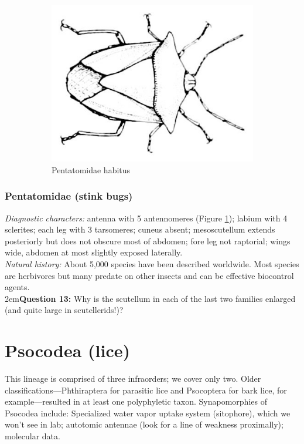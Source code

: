 \documentclass[letterpaper, 11pt]{article}
\begin{document}
\begin{figure}[ht!]
\begin{subfigure}[ht!]{0.4\textwidth}
 \includegraphics[width=\textwidth]{PentatomidHabitus}
 \caption{Pentatomidae habitus \citep[][Plate XXXII, Fig. 2]{bhl82061}}
 \label{fig:pentatomid1}
\end{subfigure}
 \caption{}\label{fig:pentscut}
\end{figure}

\subsubsection{Pentatomidae (stink bugs)}
\noindent{}\textit{Diagnostic characters:} antenna with 5 antennomeres (Figure \ref{fig:pentatomid1}); labium with 4 sclerites; each leg with 3 tarsomeres; cuneus absent; mesoscutellum extends posteriorly but does not obscure most of abdomen; fore leg not raptorial; wings wide, abdomen at most slightly exposed laterally.\\

\noindent{}\textit{Natural history:} About 5,000 species have been described worldwide. Most species are herbivores but many predate on other insects and can be effective biocontrol agents.\\

\hangindent2em\textbf{Question 13:} Why is the scutellum in each of the last two families enlarged (and quite large in scutellerids!)?\\

\section{Psocodea (lice)}
This lineage is comprised of three infraorders; we cover only two. Older classifications---Phthiraptera for parasitic lice and Psocoptera for bark lice, for example---resulted in at least one polyphyletic taxon. Synapomorphies of Psocodea include: Specialized water vapor uptake system (sitophore), which we won't see in lab; autotomic antennae (look for a line of weakness proximally); molecular data.\\
\end{document}
